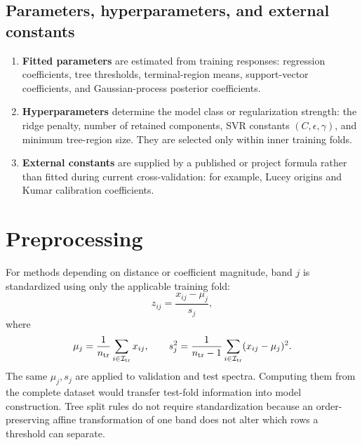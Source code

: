 \documentclass[11pt]{article}
\begin{document}
\subsection{Parameters, hyperparameters, and external constants}
\begin{enumerate}
 \item \textbf{Fitted parameters} are estimated from training responses: regression coefficients, tree thresholds, terminal-region means, support-vector coefficients, and Gaussian-process posterior coefficients.
 \item \textbf{Hyperparameters} determine the model class or regularization strength: the ridge penalty, number of retained components, SVR constants $(C,\epsilon,\gamma)$, and minimum tree-region size. They are selected only within inner training folds.
 \item \textbf{External constants} are supplied by a published or project formula rather than fitted during current cross-validation: for example, Lucey origins and Kumar calibration coefficients.
\end{enumerate}

\section{Preprocessing}
For methods depending on distance or coefficient magnitude, band $j$ is standardized using only the applicable training fold:
\begin{equation}
 z_{ij}=\frac{x_{ij}-\mu_j}{s_j},
\end{equation}
where
\begin{equation}
 \mu_j=\frac1{n_{\rm tr}}\sum_{i\in\mathcal I_{\rm tr}}x_{ij},\qquad
 s_j^2=\frac1{n_{\rm tr}-1}\sum_{i\in\mathcal I_{\rm tr}}(x_{ij}-\mu_j)^2.
\end{equation}
The same $\mu_j,s_j$ are applied to validation and test spectra. Computing them from the complete dataset would transfer test-fold information into model construction. Tree split rules do not require standardization because an order-preserving affine transformation of one band does not alter which rows a threshold can separate.
\end{document}
